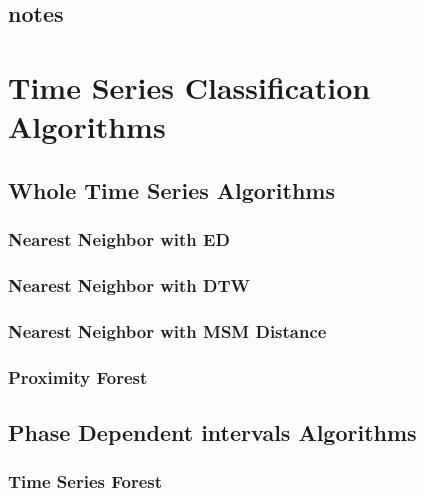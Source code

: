\subsection{notes}



\null\newpage

\section{Time Series Classification Algorithms}


\subsection{Whole Time Series Algorithms}

\subsubsection{Nearest Neighbor with ED}

\subsubsection{Nearest Neighbor with DTW}

\subsubsection{Nearest Neighbor with MSM Distance}

\subsubsection{Proximity Forest}


\subsection{Phase Dependent intervals Algorithms}

\subsubsection{Time Series Forest}


